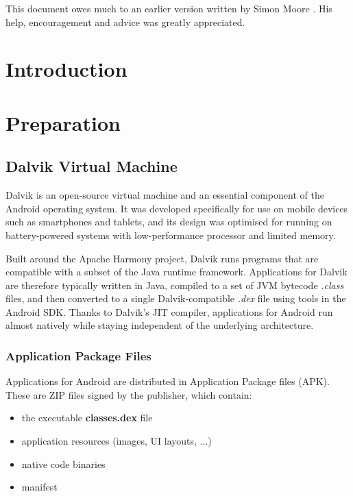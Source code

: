 \documentclass[12pt,twoside,notitlepage]{report}
\begin{document}
This document owes much to an earlier version written by Simon Moore
\cite{moore95}.  His help, encouragement and advice was greatly 
appreciated.


\cleardoublepage        %

\setcounter{page}{1}
\pagestyle{headings}

\chapter{Introduction}


\cleardoublepage
\chapter{Preparation}

\section{Dalvik Virtual Machine}

Dalvik is an open-source virtual machine and an essential component of the Android operating system. It was developed specifically for use on mobile devices such as smartphones and tablets, and its design was optimised for running on battery-powered systems with low-performance processor and limited memory. 

Built around the Apache Harmony project, Dalvik runs programs that are compatible with a subset of the Java runtime framework. Applications for Dalvik are therefore typically written in Java, compiled to a set of JVM bytecode \textit{.class} files, and then converted to a single Dalvik-compatible \textit{.dex} file using tools in the Android SDK. Thanks to Dalvik's JIT compiler, applications for Android run almost natively while staying independent of the underlying architecture.

\subsection{Application Package Files}

Applications for Android are distributed in Application Package files (APK). These are ZIP files signed by the publisher, which contain:
\begin{itemize}
\item the executable \textbf{classes.dex} file
\item application resources (images, UI layouts, ...)
\item native code binaries
\item manifest
\end{itemize}
\end{document}
